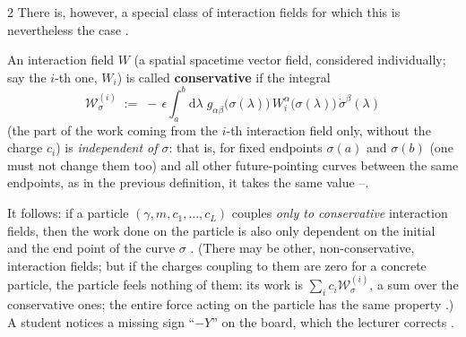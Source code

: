 \begin{paracol}{2}
There is, however, a special class of interaction fields for which this is nevertheless the case .
\begin{definition}\label{def:nd-conservative}
An interaction field $W$ (a spatial spacetime vector field, considered individually; say the $i$-th one, $W_i$) is called \textbf{conservative} if the integral
\begin{equation}\label{eq:nd-conservative}
  \mathcal W^{(i)}_\sigma\;:=\;-\,\epsilon\int_a^b\mathrm d\lambda\;g_{\alpha\beta}\bigl(\sigma(\lambda)\bigr)\,W_i^\alpha\bigl(\sigma(\lambda)\bigr)\,\dot\sigma^\beta(\lambda)
\end{equation}
(the part of the work coming from the $i$-th interaction field only, without the charge $c_i$) is \emph{independent of $\sigma$}: that is, for fixed endpoints $\sigma(a)$ and $\sigma(b)$ (one must not change them too) and all other future-pointing curves between the same endpoints, as in the previous definition, it takes the same value --.
\end{definition}
It follows: if a particle $(\gamma,m,c_1,\dots,c_L)$ couples \emph{only to conservative} interaction fields, then the work done on the particle is also only dependent on the initial and the end point of the curve $\sigma$ . (There may be other, non-conservative, interaction fields; but if the charges coupling to them are zero for a concrete particle, the particle feels nothing of them: its work is $\sum_ic_i\mathcal W^{(i)}_\sigma$,
a sum over the conservative ones; the entire force acting on the particle has the same property .) A student notices a missing sign ``$-Y$'' on the board, which the lecturer corrects .


\end{paracol}

